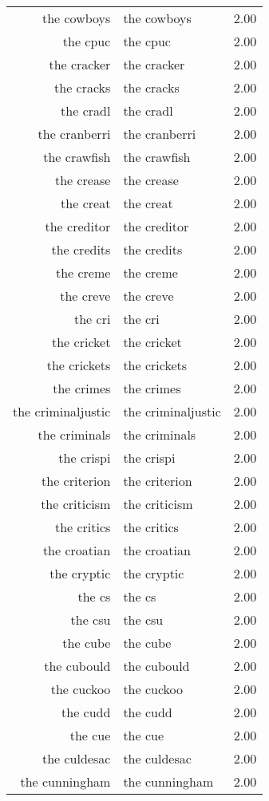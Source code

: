 \begin{table}[ht]
\begin{tabular}{rlr}
  the cowboys & the cowboys & 2.00 \\ 
  the cpuc & the cpuc & 2.00 \\ 
  the cracker & the cracker & 2.00 \\ 
  the cracks & the cracks & 2.00 \\ 
  the cradl & the cradl & 2.00 \\ 
  the cranberri & the cranberri & 2.00 \\ 
  the crawfish & the crawfish & 2.00 \\ 
  the crease & the crease & 2.00 \\ 
  the creat & the creat & 2.00 \\ 
  the creditor & the creditor & 2.00 \\ 
  the credits & the credits & 2.00 \\ 
  the creme & the creme & 2.00 \\ 
  the creve & the creve & 2.00 \\ 
  the cri & the cri & 2.00 \\ 
  the cricket & the cricket & 2.00 \\ 
  the crickets & the crickets & 2.00 \\ 
  the crimes & the crimes & 2.00 \\ 
  the criminaljustic & the criminaljustic & 2.00 \\ 
  the criminals & the criminals & 2.00 \\ 
  the crispi & the crispi & 2.00 \\ 
  the criterion & the criterion & 2.00 \\ 
  the criticism & the criticism & 2.00 \\ 
  the critics & the critics & 2.00 \\ 
  the croatian & the croatian & 2.00 \\ 
  the cryptic & the cryptic & 2.00 \\ 
  the cs & the cs & 2.00 \\ 
  the csu & the csu & 2.00 \\ 
  the cube & the cube & 2.00 \\ 
  the cubould & the cubould & 2.00 \\ 
  the cuckoo & the cuckoo & 2.00 \\ 
  the cudd & the cudd & 2.00 \\ 
  the cue & the cue & 2.00 \\ 
  the culdesac & the culdesac & 2.00 \\ 
  the cunningham & the cunningham & 2.00 \\ 

\end{tabular}
\end{table}
